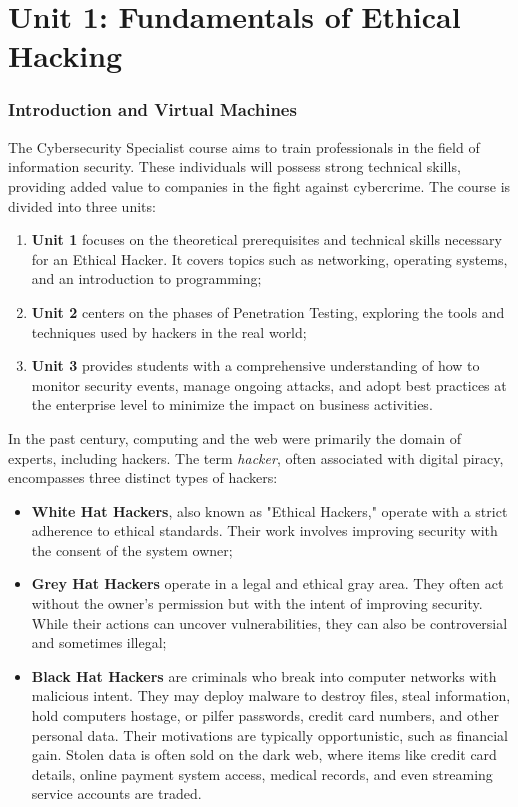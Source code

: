 \part{Unit 1: Fundamentals of Ethical Hacking}
\section{Introduction and Virtual Machines}

The Cybersecurity Specialist course aims to train professionals in the field of information security. These individuals will possess strong technical skills, providing added value to companies in the fight against cybercrime. The course is divided into three units:
\begin{enumerate}
    \item \textbf{Unit 1} focuses on the theoretical prerequisites and technical skills necessary for an Ethical Hacker. It covers topics such as networking, operating systems, and an introduction to programming;
    \item \textbf{Unit 2} centers on the phases of Penetration Testing, exploring the tools and techniques used by hackers in the real world;
    \item \textbf{Unit 3} provides students with a comprehensive understanding of how to monitor security events, manage ongoing attacks, and adopt best practices at the enterprise level to minimize the impact on business activities.
\end{enumerate}

In the past century, computing and the web were primarily the domain of experts, including hackers. The term \emph{hacker}, often associated with digital piracy, encompasses three distinct types of hackers:
\begin{itemize}
    \item \textbf{White Hat Hackers}, also known as "Ethical Hackers," operate with a strict adherence to ethical standards. Their work involves improving security with the consent of the system owner;
    \item \textbf{Grey Hat Hackers} operate in a legal and ethical gray area. They often act without the owner's permission but with the intent of improving security. While their actions can uncover vulnerabilities, they can also be controversial and sometimes illegal;
    \item \textbf{Black Hat Hackers} are criminals who break into computer networks with malicious intent. They may deploy malware to destroy files, steal information, hold computers hostage, or pilfer passwords, credit card numbers, and other personal data. Their motivations are typically opportunistic, such as financial gain. Stolen data is often sold on the dark web, where items like credit card details, online payment system access, medical records, and even streaming service accounts are traded.
\end{itemize}

